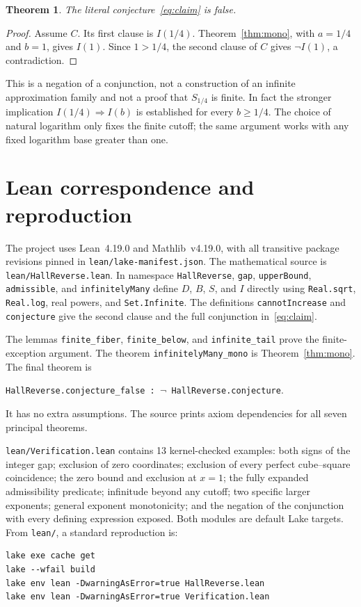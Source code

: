 \documentclass[11pt]{article}
\newtheorem{theorem}{Theorem}
\begin{document}
\begin{theorem}
The literal conjecture~\eqref{eq:claim} is false.
\end{theorem}
\begin{proof}
Assume $C$. Its first clause is $I(1/4)$. Theorem~\ref{thm:mono}, with
$a=1/4$ and $b=1$, gives $I(1)$. Since $1>1/4$, the second clause of $C$
gives $\neg I(1)$, a contradiction.
\end{proof}

This is a negation of a conjunction, not a construction of an infinite
approximation family and not a proof that $S_{1/4}$ is finite. In fact the
stronger implication $I(1/4)\Rightarrow I(b)$ is established for every
$b\ge1/4$. The choice of natural logarithm only fixes the finite cutoff;
the same argument works with any fixed logarithm base greater than one.

\clearpage
\section{Lean correspondence and reproduction}
The project uses Lean~4.19.0 and Mathlib~v4.19.0, with all transitive package
revisions pinned in \texttt{lean/lake-manifest.json}. The mathematical source
is \texttt{lean/HallReverse.lean}. In namespace \texttt{HallReverse},
\texttt{gap}, \texttt{upperBound}, \texttt{admissible}, and
\texttt{infinitelyMany} define $D$, $B$, $S$, and $I$ directly using
\texttt{Real.sqrt}, \texttt{Real.log}, real powers, and \texttt{Set.Infinite}.
The definitions \texttt{cannotIncrease} and \texttt{conjecture} give the
second clause and the full conjunction in~\eqref{eq:claim}.

The lemmas \texttt{finite\_fiber}, \texttt{finite\_below}, and
\texttt{infinite\_tail} prove the finite-exception argument.
The theorem \texttt{infinitelyMany\_mono} is Theorem~\ref{thm:mono}.
The final theorem is
\begin{center}
\texttt{HallReverse.conjecture\_false : $\neg$ HallReverse.conjecture}.
\end{center}
It has no extra assumptions. The source prints axiom dependencies for all
seven principal theorems.

\texttt{lean/Verification.lean} contains 13 kernel-checked examples: both
signs of the integer gap; exclusion of zero coordinates; exclusion of every
perfect cube--square coincidence; the zero bound and exclusion at $x=1$;
the fully expanded admissibility predicate; infinitude beyond any cutoff;
two specific larger exponents; general exponent monotonicity; and the
negation of the conjunction with every defining expression exposed.
Both modules are default Lake targets. From \texttt{lean/}, a standard
reproduction is:
\begin{verbatim}
lake exe cache get
lake --wfail build
lake env lean -DwarningAsError=true HallReverse.lean
lake env lean -DwarningAsError=true Verification.lean
\end{verbatim}
\end{document}
